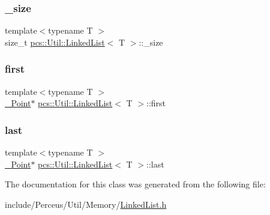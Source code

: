 \subsubsection{\texorpdfstring{\+\_\+size}{\_size}}
{\footnotesize\ttfamily template$<$typename T $>$ \\
size\+\_\+t \hyperlink{classpcs_1_1Util_1_1LinkedList}{pcs\+::\+Util\+::\+Linked\+List}$<$ T $>$\+::\+\_\+size\hspace{0.3cm}{\ttfamily [private]}}

\mbox{\label{classpcs_1_1Util_1_1LinkedList_a16b8eb9f35fc53d3a0d6c272aec4acc0}} 
\subsubsection{\texorpdfstring{first}{first}}
{\footnotesize\ttfamily template$<$typename T $>$ \\
\hyperlink{structpcs_1_1Util_1_1LinkedList_1_1__Point}{\+\_\+\+Point}$\ast$ \hyperlink{classpcs_1_1Util_1_1LinkedList}{pcs\+::\+Util\+::\+Linked\+List}$<$ T $>$\+::first\hspace{0.3cm}{\ttfamily [private]}}

\mbox{\label{classpcs_1_1Util_1_1LinkedList_a1760a747315ea22fe748f36c6016a32c}} 
\subsubsection{\texorpdfstring{last}{last}}
{\footnotesize\ttfamily template$<$typename T $>$ \\
\hyperlink{structpcs_1_1Util_1_1LinkedList_1_1__Point}{\+\_\+\+Point}$\ast$ \hyperlink{classpcs_1_1Util_1_1LinkedList}{pcs\+::\+Util\+::\+Linked\+List}$<$ T $>$\+::last\hspace{0.3cm}{\ttfamily [private]}}



The documentation for this class was generated from the following file\+:\begin{DoxyCompactItemize}
\item 
include/\+Perceus/\+Util/\+Memory/\hyperlink{LinkedList_8h}{Linked\+List.\+h}\end{DoxyCompactItemize}
